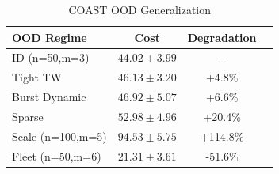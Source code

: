 \begin{table}[t]
\centering\caption{COAST OOD Generalization}\label{tab:ood}
\begin{tabular}{lccc}\toprule
OOD Regime & Cost & Degradation \\ \midrule
ID (n=50,m=3) & $44.02\pm3.99$ & --- \\
Tight TW & $46.13\pm3.20$ & +4.8\% \\
Burst Dynamic & $46.92\pm5.07$ & +6.6\% \\
Sparse & $52.98\pm4.96$ & +20.4\% \\
Scale (n=100,m=5) & $94.53\pm5.75$ & +114.8\% \\
Fleet (n=50,m=6) & $21.31\pm3.61$ & -51.6\% \\ \bottomrule
\end{tabular}\end{table}